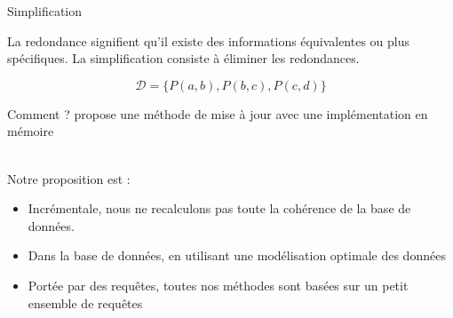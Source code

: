 \begin{frame}{Simplification}
    \begin{block}{}
        La redondance signifient qu'il existe des informations équivalentes ou plus spécifiques.
        La simplification consiste à éliminer les redondances.

        \[
            \mathcal{D} = \{P(a, b), P(b, c), P(c, d)\}
        \]
    \end{block}
    \vfill
    \begin{center}
    \end{center}
\end{frame}

\begin{frame}{Comment ?}
    \cite{chabinConsistentUpdatingDatabases2020} propose une méthode de mise à jour avec une implémentation en mémoire\\~

    Notre proposition est :
    \begin{itemize}
        \item Incrémentale, nous ne recalculons pas toute la cohérence de la base de données.
        \item Dans la base de données, en utilisant une modélisation optimale des données
        \item Portée par des requêtes, toutes nos méthodes sont basées sur un petit ensemble de requêtes
    \end{itemize}
\end{frame}


